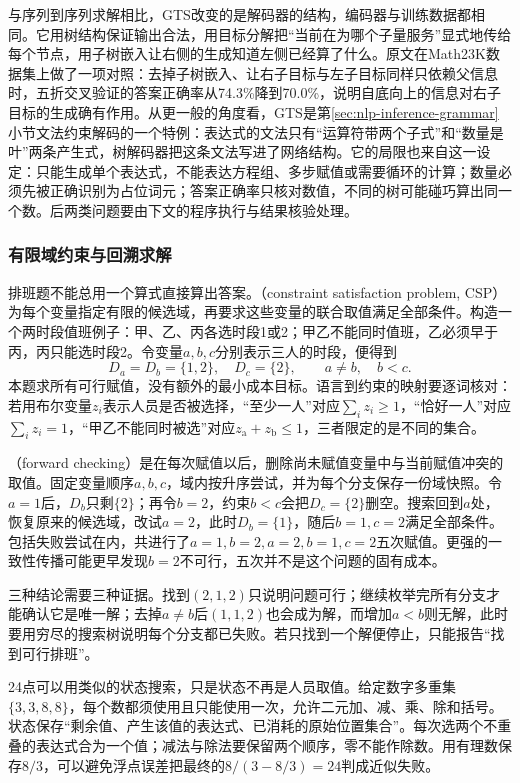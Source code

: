 与序列到序列求解相比，GTS改变的是解码器的结构，编码器与训练数据都相同。它用树结构保证输出合法，用目标分解把“当前在为哪个子量服务”显式地传给每个节点，用子树嵌入让右侧的生成知道左侧已经算了什么。原文在Math23K数据集上做了一项对照：去掉子树嵌入、让右子目标与左子目标同样只依赖父信息时，五折交叉验证的答案正确率从74.3\%降到70.0\%，说明自底向上的信息对右子目标的生成确有作用。从更一般的角度看，GTS是第\ref{sec:nlp-inference-grammar}小节文法约束解码的一个特例：表达式的文法只有“运算符带两个子式”和“数量是叶”两条产生式，树解码器把这条文法写进了网络结构。它的局限也来自这一设定：只能生成单个表达式，不能表达方程组、多步赋值或需要循环的计算；数量必须先被正确识别为占位词元；答案正确率只核对数值，不同的树可能碰巧算出同一个数。后两类问题要由下文的程序执行与结果核验处理。

\subsubsection{有限域约束与回溯求解}
\label{sec:nlp-execution-csp}

排班题不能总用一个算式直接算出答案。（constraint satisfaction problem, CSP）为每个变量指定有限的候选域，再要求这些变量的联合取值满足全部条件。构造一个两时段值班例子：甲、乙、丙各选时段1或2；甲乙不能同时值班，乙必须早于丙，丙只能选时段2。令变量$a,b,c$分别表示三人的时段，便得到
\[
 D_a=D_b=\{1,2\},\quad D_c=\{2\},\qquad a\ne b,\quad b<c.
\]
本题求所有可行赋值，没有额外的最小成本目标。语言到约束的映射要逐词核对：若用布尔变量$z_i$表示人员是否被选择，“至少一人”对应$\sum_i z_i\geq1$，“恰好一人”对应$\sum_i z_i=1$，“甲乙不能同时被选”对应$z_{\mathrm{a}}+z_{\mathrm{b}}\leq1$，三者限定的是不同的集合。

（forward checking）是在每次赋值以后，删除尚未赋值变量中与当前赋值冲突的取值。固定变量顺序$a,b,c$，域内按升序尝试，并为每个分支保存一份域快照。令$a=1$后，$D_b$只剩$\{2\}$；再令$b=2$，约束$b<c$会把$D_c=\{2\}$删空。搜索回到$a$处，恢复原来的候选域，改试$a=2$，此时$D_b=\{1\}$，随后$b=1,c=2$满足全部条件。包括失败尝试在内，共进行了$a=1,b=2,a=2,b=1,c=2$五次赋值。更强的一致性传播可能更早发现$b=2$不可行，五次并不是这个问题的固有成本。

三种结论需要三种证据。找到$(2,1,2)$只说明问题可行；继续枚举完所有分支才能确认它是唯一解；去掉$a\ne b$后$(1,1,2)$也会成为解，而增加$a<b$则无解，此时要用穷尽的搜索树说明每个分支都已失败。若只找到一个解便停止，只能报告“找到可行排班”。

24点可以用类似的状态搜索，只是状态不再是人员取值。给定数字多重集$\{3,3,8,8\}$，每个数都须使用且只能使用一次，允许二元加、减、乘、除和括号。状态保存“剩余值、产生该值的表达式、已消耗的原始位置集合”。每次选两个不重叠的表达式合为一个值；减法与除法要保留两个顺序，零不能作除数。用有理数保存$8/3$，可以避免浮点误差把最终的$8/(3-8/3)=24$判成近似失败。

